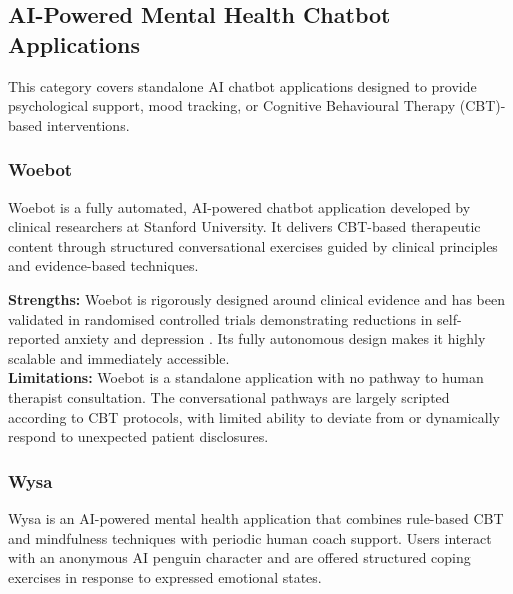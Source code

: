 \subsection{AI-Powered Mental Health Chatbot Applications}
\label{subsec:chatbots}

This category covers standalone AI chatbot applications designed to provide
psychological support, mood tracking, or Cognitive Behavioural Therapy
(CBT)-based interventions.

\subsubsection{Woebot}

Woebot is a fully automated, AI-powered chatbot application developed by clinical
researchers at Stanford University. It delivers CBT-based therapeutic content
through structured conversational exercises guided by clinical principles and
evidence-based techniques.

\begin{tcolorbox}[colback=lightgray, colframe=accentblue, title=\textbf{Woebot — Assessment}, fonttitle=\bfseries, sharp corners=south]
  \textbf{Strengths:} Woebot is rigorously designed around clinical evidence and
  has been validated in randomised controlled trials demonstrating reductions in
  self-reported anxiety and depression \cite{Fitzpatrick2017}. Its fully
  autonomous design makes it highly scalable and immediately accessible. \\[4pt]
  \textbf{Limitations:} Woebot is a standalone application with no pathway to
  human therapist consultation. The conversational pathways are largely scripted
  according to CBT protocols, with limited ability to deviate from or dynamically
  respond to unexpected patient disclosures.
\end{tcolorbox}

\subsubsection{Wysa}

Wysa is an AI-powered mental health application that combines rule-based CBT and
mindfulness techniques with periodic human coach support. Users interact with an
anonymous AI penguin character and are offered structured coping exercises in
response to expressed emotional states.

